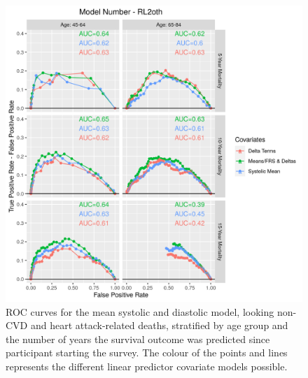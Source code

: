 \documentclass[
]{article}
\begin{document}
\begin{figure}
\hypertarget{fig:ROC_RL2oth}{%
\centering
\includegraphics{./Rmarkdown_Plots/ROC_CAx-Covariates_EventType_RL2oth.png}
\caption{ROC curves for the mean systolic and diastolic model, looking non-CVD and heart attack-related deaths, stratified by age group and the number of years the survival outcome was predicted since participant starting the survey. The colour of the points and lines represents the different linear predictor covariate models possible.}\label{fig:ROC_RL2oth}
}
\end{figure}
\end{document}
